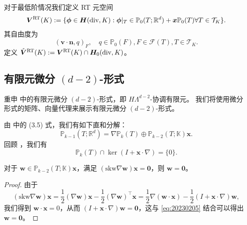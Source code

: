 对于最低阶情况我们定义 RT 元空间~\cite{RaviartThomas1977,Nedelec1980}
\[
\boldsymbol{V}^{\mathrm{RT}}(K):=\{\boldsymbol{\phi}\in\boldsymbol{H}(\operatorname{div},
    K): \boldsymbol{\phi}|_{T}\in \mathbb P_{0}(T;\mathbb
R^d)+\boldsymbol{x}\mathbb P_{0}(T) \forall T\in\mathcal T_K\}.
\]
其自由度为
\[
(\boldsymbol{v}\cdot\boldsymbol{n}, q)_F,  \quad q\in \mathbb P_{0}(F), F\in\mathcal F(T)
, T\in\mathcal T_K.
\]
定义 $\mathring{\boldsymbol{V}}^{\mathrm{RT}}(K):=\boldsymbol{V}^{\mathrm{RT}}(K)\cap \boldsymbol{H}_0(\operatorname{div}, K)$。

\subsection{有限元微分 $(d-2)$-形式}
重申 \cite{ArnoldFalkWinther2006, Arnold2018} 中的有限元微分
$(d-2)$-形式，即 $H\Lambda^{d-2}$-协调有限元。
我们将使用微分形式的矩阵、向量代理来展示有限元微分 
$(d-2)$-形式。

由 \cite{ChenHuang2021divdiv} 中的 (3.5) 式，我们有如下直和分解：
\begin{equation}\label{eq:Pkvectordecomp}
\mathbb P_{k-1}(T;\mathbb R^{d})=\nabla\mathbb P_k(T)\oplus\mathbb P_{k-2}(T;\mathbb K)\boldsymbol{x}.
\end{equation}
回顾 \cite[(35)]{Chen;Huang:2020Finite}，我们有
\begin{equation}\label{eq:20230205}
\mathbb P_{k}(T)\cap\ker(I+\boldsymbol{x}\cdot\nabla)=\{0\}.
\end{equation}

\begin{lemma}\label{lem:mathrm{skw}grad}
对于 $\boldsymbol{w}\in\mathbb P_{k-2}(T;\mathbb K)\boldsymbol{x}$，满足 $(\mathrm{skw}\nabla\boldsymbol{w})\boldsymbol{x}=\boldsymbol{0}$，则 $\boldsymbol{w}=\boldsymbol{0}$。
\end{lemma}
\begin{proof}
由于
\begin{equation*}%
(\mathrm{skw}\nabla\boldsymbol{w})\boldsymbol{x}=\frac{1}{2}(\nabla\boldsymbol{w})\boldsymbol{x}-\frac{1}{2}(\nabla\boldsymbol{w})^{\intercal}\boldsymbol{x}=\frac{1}{2}\nabla(\boldsymbol{w}\cdot\boldsymbol{x})-\frac{1}{2}(I+\boldsymbol{x}\cdot\nabla)\boldsymbol{w},
\end{equation*}
我们得到 $\boldsymbol{w}\cdot\boldsymbol{x}=0$，从而 $(I+\boldsymbol{x}\cdot\nabla)\boldsymbol{w}=\boldsymbol{0}$，这与 \eqref{eq:20230205} 结合可以得出 $\boldsymbol{w}=\boldsymbol{0}$。
\end{proof}


